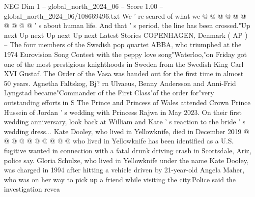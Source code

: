 \begin{textsample}{NEG Dim 1 – global\_north\_2024\_06 – Score 1.00 – global\_north\_2024\_06/108669496.txt}
We ' re scared of what we @ @ @ @ @ @ @ @ @ @ ' s about human life.
And that ' s period, the line has been crossed."Up next Up next Up next Up next Latest Stories COPENHAGEN, Denmark ( AP ) -- The four members of the Swedish pop quartet ABBA, who triumphed at the 1974 Eurovision Song Contest with the peppy love song"Waterloo,"on Friday got one of the most prestigious knighthoods in Sweden from the Swedish King Carl XVI Gustaf.
The Order of the Vasa was handed out for the first time in almost 50 years.
Agnetha Faltskog, Bj? rn Ulvaeus, Benny Andersson and Anni-Frid Lyngstad became"Commander of the First Class"of the order for"very outstanding efforts in S The Prince and Princess of Wales attended Crown Prince Hussein of Jordan ' s wedding with Princess Rajwa in May 2023.
On their first wedding anniversary, look back at William and Kate ' s reaction to the bride ' s wedding dress...
Kate Dooley, who lived in Yellowknife, died in December 2019 @ @ @ @ @ @ @ @ @ @ who lived in Yellowknife has been identified as a U.S. fugitive wanted in connection with a fatal drunk driving crash in Scottsdale, Ariz, police say.
Gloria Schulze, who lived in Yellowknife under the name Kate Dooley, was charged in 1994 after hitting a vehicle driven by 21-year-old Angela Maher, who was on her way to pick up a friend while visiting the city.Police said the investigation revea

\end{textsample}
